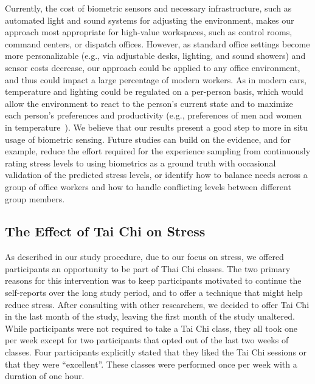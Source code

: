 Currently, the cost of biometric sensors and necessary infrastructure,
such as automated light and sound systems for adjusting the
environment, makes our approach most appropriate for high-value
workspaces, such as control rooms, command centers, or dispatch
offices. However, as standard office settings become more
personalizable (e.g., via adjustable desks, lighting, and sound
showers) and sensor costs decrease, our approach could be applied to
any office environment, and thus could impact a large percentage of
modern workers. As in modern cars, temperature and lighting could be
regulated on a per-person basis, which would allow the environment to
react to the person's current state and to maximize each person's
preferences and productivity (e.g., preferences of men and women in
temperature~\cite{Karjalainen07}). 
We believe that our results present a good step to more in situ usage of biometric sensing. Future studies can build on the evidence, and for example, reduce the effort required for the experience sampling from continuously rating stress levels to using biometrics as a ground truth with occasional validation of the predicted stress levels, or
identify how to balance needs across a group of office workers and how
to handle conflicting levels between different group members.




\subsection{The Effect of Tai Chi on Stress}
As described in our study procedure,
due to our focus on stress, we offered participants an opportunity to be part of Thai Chi classes.
The two primary reasons for this intervention was to keep participants motivated to continue the self-reports over the long study period, and to offer a technique that might help reduce stress.
After consulting with other researchers, we decided to offer Tai Chi in the last month of the study, leaving the first month of the study unaltered. While participants were not required to take a Tai Chi class, they all took one per week except for two participants that opted out of the last two weeks of classes. Four participants explicitly stated that they liked the Tai Chi sessions or that they were ``excellent''.
These classes were performed once per week with a duration of one hour.

